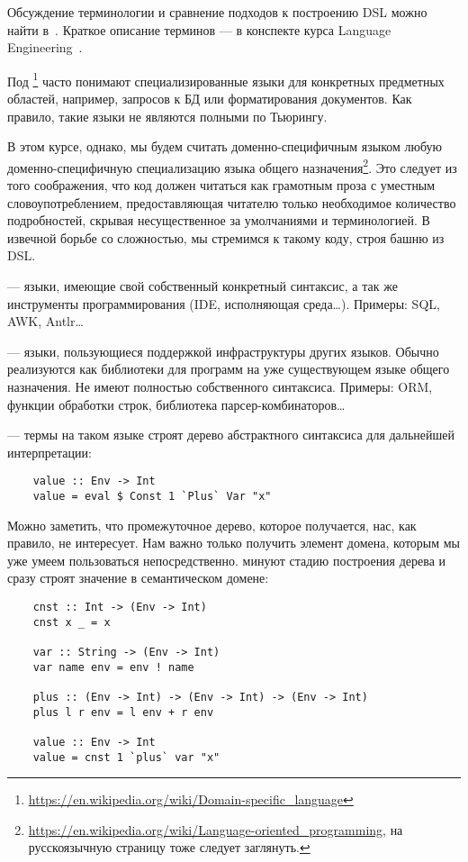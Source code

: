 Обсуждение терминологии и сравнение подходов к построению DSL можно найти в~\cite{gibbons2013functional}.
Краткое описание терминов --- в конспекте курса Language Engineering~\cite{languageEngineering}.

Под \footnote{\url{https://en.wikipedia.org/wiki/Domain-specific_language}} часто понимают специализированные языки для конкретных предметных областей, например, запросов к БД или форматирования документов.
Как правило, такие языки не являются полными по Тьюрингу.

В этом курсе, однако, мы будем считать доменно-специфичным языком любую доменно-специфичную специализацию языка общего назначения\footnote{\url{https://en.wikipedia.org/wiki/Language-oriented_programming}, на русскоязычную страницу тоже следует заглянуть.}.
Это следует из того соображения, что код должен читаться как грамотным проза с уместным словоупотреблением, предоставляющая читателю только необходимое количество подробностей, скрывая несущественное за умолчаниями и терминологией.
В извечной борьбе со сложностью, мы стремимся к такому коду, строя башню из DSL\@.

 --- языки, имеющие свой собственный конкретный синтаксис, а так же инструменты программирования (IDE, исполняющая среда\ldots).
Примеры: SQL, AWK, Antlr\ldots

 --- языки, пользующиеся поддержкой инфраструктуры других языков.
Обычно реализуются как библиотеки для программ на уже существующем языке общего назначения.
Не имеют полностью собственного синтаксиса.
Примеры: ORM, функции обработки строк, библиотека парсер-комбинаторов\ldots

 --- термы на таком языке строят дерево абстрактного синтаксиса для дальнейшей интерпретации:
\begin{verbatim}
    value :: Env -> Int
    value = eval $ Const 1 `Plus` Var "x"
\end{verbatim}

Можно заметить, что промежуточное дерево, которое получается, нас, как правило, не интересует.
Нам важно только получить элемент домена, которым мы уже умеем пользоваться непосредственно.
 минуют стадию построения дерева и сразу строят значение в семантическом домене:
\begin{verbatim}
    cnst :: Int -> (Env -> Int)
    cnst x _ = x

    var :: String -> (Env -> Int)
    var name env = env ! name

    plus :: (Env -> Int) -> (Env -> Int) -> (Env -> Int)
    plus l r env = l env + r env

    value :: Env -> Int
    value = cnst 1 `plus` var "x"
\end{verbatim}

